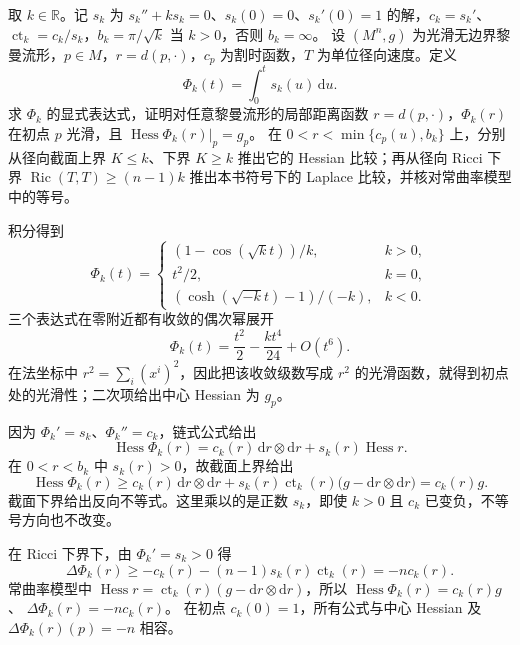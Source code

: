 \begin{exercise}\label{g3:ex:model-radial-potential}
	取 \(k\in\mathbb R\)。记 \(s_k\) 为 \(s_k''+ks_k=0\)、\(s_k(0)=0\)、\(s_k'(0)=1\) 的解，\(c_k=s_k'\)、\(\operatorname{ct}_k=c_k/s_k\)，\(b_k=\pi/\sqrt k\) 当 \(k>0\)，否则 \(b_k=\infty\)。
	设 \((M^n,g)\) 为光滑无边界黎曼流形，\(p\in M\)，\(r=d(p,\cdot)\)，\(c_p\) 为割时函数，\(T\) 为单位径向速度。定义
	\[
		\Phi_k(t)=\int_0^t s_k(u)\,\mathrm du.
	\]
	求 \(\Phi_k\) 的显式表达式，证明对任意黎曼流形的局部距离函数 \(r=d(p,\cdot)\)，\(\Phi_k(r)\) 在初点 \(p\) 光滑，且
	\(\operatorname{Hess}\Phi_k(r)|_p=g_p\)。
	在 \(0<r<\min\{c_p(u),b_k\}\) 上，分别从径向截面上界 \(K\le k\)、下界 \(K\ge k\) 推出它的 Hessian 比较；再从径向 Ricci 下界 \(\operatorname{Ric}(T,T)\ge(n-1)k\) 推出本书符号下的 Laplace 比较，并核对常曲率模型中的等号。
\end{exercise}
\begin{solution}
	积分得到
	\[
		\Phi_k(t)=
		\begin{cases}
			(1-\cos(\sqrt{k}t))/k,&k>0,\\
			t^2/2,&k=0,\\
			(\cosh(\sqrt{-k}t)-1)/(-k),&k<0.
		\end{cases}
	\]
	三个表达式在零附近都有收敛的偶次幂展开
	\[
		\Phi_k(t)=\frac{t^2}{2}-\frac{kt^4}{24}+O(t^6).
	\]
	在法坐标中 \(r^2=\sum_i(x^i)^2\)，因此把该收敛级数写成 \(r^2\) 的光滑函数，就得到初点处的光滑性；二次项给出中心 Hessian 为 \(g_p\)。

	因为 \(\Phi_k'=s_k\)、\(\Phi_k''=c_k\)，链式公式给出
	\[
		\operatorname{Hess}\Phi_k(r)
		=c_k(r)\,\mathrm dr\otimes\mathrm dr
		+s_k(r)\operatorname{Hess}r.
	\]
	在 \(0<r<b_k\) 中 \(s_k(r)>0\)，故截面上界给出
	\[
		\operatorname{Hess}\Phi_k(r)
		\ge c_k(r)\,\mathrm dr\otimes\mathrm dr+
		s_k(r)\operatorname{ct}_k(r)
		\bigl(g-\mathrm dr\otimes\mathrm dr\bigr)
		=c_k(r)g.
	\]
	截面下界给出反向不等式。这里乘以的是正数 \(s_k\)，即使 \(k>0\) 且 \(c_k\) 已变负，不等号方向也不改变。

	在 Ricci 下界下，由 \(\Phi_k'=s_k>0\) 得
	\[
		\Delta\Phi_k(r)
		\ge-c_k(r)-(n-1)s_k(r)\operatorname{ct}_k(r)
		=-n c_k(r).
	\]
	常曲率模型中 \(\operatorname{Hess}r=\operatorname{ct}_k(r)(g-\mathrm dr\otimes\mathrm dr)\)，所以
	\(\operatorname{Hess}\Phi_k(r)=c_k(r)g\)、
	\(\Delta\Phi_k(r)=-n c_k(r)\)。
	在初点 \(c_k(0)=1\)，所有公式与中心 Hessian 及 \(\Delta\Phi_k(r)(p)=-n\) 相容。
\end{solution}

